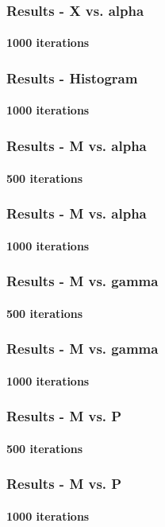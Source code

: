 \documentclass{beamer}   %
\begin{document}
\begin{frame}
  \frametitle{Results - X vs. alpha }
  \framesubtitle{1000 iterations}
  \hspace*{-5mm}
\end{frame}

\begin{frame}
  \frametitle{Results - Histogram}
  \framesubtitle{1000 iterations}
\end{frame}



\begin{frame}
  \frametitle{Results - M vs. alpha }
  \framesubtitle{500 iterations}
  \hspace*{-5mm}
\end{frame}

\begin{frame}
  \frametitle{Results - M vs. alpha }
  \framesubtitle{1000 iterations}
  \hspace*{-5mm}
\end{frame}
\begin{frame}
  \frametitle{Results - M vs. gamma }
  \framesubtitle{500 iterations}
  \hspace*{-5mm}
\end{frame}

\begin{frame}
  \frametitle{Results - M vs. gamma }
  \framesubtitle{1000 iterations}
  \hspace*{-5mm}
\end{frame}





\begin{frame}
  \frametitle{Results - M vs. P }
  \framesubtitle{500 iterations}
  \hspace*{-5mm}
\end{frame}


\begin{frame}
  \frametitle{Results - M vs. P }
  \framesubtitle{1000 iterations}
  \hspace*{-5mm}
\end{frame}
\end{document}

